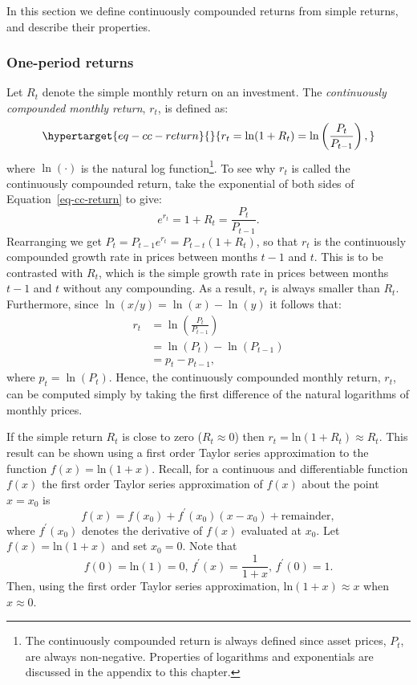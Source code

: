 \documentclass[
  letterpaper,
  DIV=11,
  numbers=noendperiod]{scrreprt}
\theoremstyle{definition}
\theoremstyle{definition}
\theoremstyle{remark}
\begin{document}
 In this section we define
continuously compounded returns from simple returns, and describe their
properties.

\hypertarget{one-period-returns}{%
\subsubsection{One-period returns}\label{one-period-returns}}

Let \(R_{t}\) denote the simple monthly return on an investment. The
\emph{continuously compounded monthly return}, \(r_{t}\), is defined as:
\begin{equation}\protect\hypertarget{eq-cc-return}{}{
r_{t}=\ln(1+R_{t})=\ln\left(\frac{P_{t}}{P_{t-1}}\right),
}\label{eq-cc-return}\end{equation} where \(\ln(\cdot)\) is the natural
log function\footnote{The continuously compounded return is always
  defined since asset prices, \(P_{t}\), are always non-negative.
  Properties of logarithms and exponentials are discussed in the
  appendix to this chapter.}. To see why \(r_{t}\) is called the
continuously compounded return, take the exponential of both sides of
Equation~\ref{eq-cc-return} to give:
\[e^{r_{t}}=1+R_{t}=\frac{P_{t}}{P_{t-1}}.\] Rearranging we get
\(P_{t}=P_{t-1}e^{r_{t}}=P_{t-t}(1+R_{t})\), so that \(r_{t}\) is the
continuously compounded growth rate in prices between months \(t-1\) and
\(t\). This is to be contrasted with \(R_{t}\), which is the simple
growth rate in prices between months \(t-1\) and \(t\) without any
compounding. As a result, \(r_{t}\) is always smaller than \(R_{t}\).
Furthermore, since \(\ln\left(x/y\right)=\ln(x)-\ln(y)\) it follows
that: \begin{align*}
r_{t} & =\ln\left(\frac{P_{t}}{P_{t-1}}\right)\\
& =\ln(P_{t})-\ln(P_{t-1})\\
& =p_{t}-p_{t-1},
\end{align*} where \(p_{t}=\ln(P_{t})\). Hence, the continuously
compounded monthly return, \(r_{t}\), can be computed simply by taking
the first difference of the natural logarithms of monthly prices.

If the simple return \(R_{t}\) is close to zero (\(R_{t}\approx0\)) then
\(r_{t}=\mathrm{ln}(1+R_{t})\approx R_{t}\). This result can be shown
using a first order Taylor series approximation to the function
\(f(x)=\mathrm{ln}(1+x).\) Recall, for a continuous and differentiable
function \(f(x)\) the first order Taylor series approximation of
\(f(x)\) about the point \(x=x_{0}\) is
\[f(x)=f(x_{0})+f^{\prime}(x_{0})(x-x_{0})+\mathrm{remainder},\] where
\(f^{\prime}(x_{0})\) denotes the derivative of \(f(x)\) evaluated at
\(x_{0}.\) Let \(f(x)=\mathrm{ln}(1+x)\) and set \(x_{0}=0.\) Note that
\[f(0)=\mathrm{ln}(1)=0,\,f^{\prime}(x)=\frac{1}{1+x},\,f^{\prime}(0)=1.\]
Then, using the first order Taylor series approximation,
\(\mathrm{ln}(1+x)\approx x\) when \(x\approx0.\)
\end{document}

